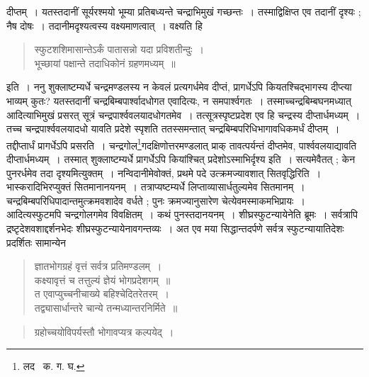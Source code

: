 \documentclass[11pt, openany]{book}
\begin{document}
\noindent दीप्तम्~। यतस्तदानीं सूर्यरश्मयो भूम्या प्रतिबध्यन्ते चन्द्राभिमुखं गच्छन्तः~। तस्माद्विक्षिप्त एव तदानीं दृश्यः ; 
नैष दोषः~। तदानीमदृश्यत्वस्य वक्ष्यमाणत्वात्~। वक्ष्यति हि\textendash  
\begin{quote}
{\qt स्फुटशशिमासान्तेऽर्कं पातासन्नो यदा प्रविशतीन्दुः~। \\
 भूच्छायां पक्षान्ते तदाधिकोनं ग्रहणमध्यम्~॥}
\end{quote}
इति~। ननु शुक्लाष्टम्यर्धे चन्द्रमण्डलस्य न केवलं प्रत्यगर्धमेव दीप्तं, प्रागर्धेऽपि कियतश्चिद्भागस्य दीप्त्या भाव्यम् कुतः? यतस्तदानीं चन्द्रबिम्बपार्श्वादधोगत एवादित्यः, न समपार्श्वगतः~। तस्माच्चन्द्रबिम्बघनमध्यात् आदित्याभिमुखं प्रसरत् सूत्रं चन्द्रपार्श्ववलयादधोगतमेव~।
तत्सूत्रस्पृष्टप्रदेश एव हि चन्द्रस्य दीप्तार्धमध्यम्~। तच्च चन्द्रपार्श्ववलयादधो यावति प्रदेशे स्पृशति ततस्समन्तात् चन्द्रबिम्बपरिधिभागावधिकमर्धं दीप्तम्~। तद्दीप्तार्धं प्रागर्धेऽपि प्रसरति~। चन्द्रगोल\renewcommand{\thefootnote}{१}\footnote{लद \textendash\ क. ग. घ.}गदक्षिणोत्तरमण्डलात् प्राक् तावत्पर्यन्तं दीप्तमेव, पार्श्ववलयाद्यावति दीप्तार्धमध्यम्~। तस्मात् शुक्लाष्टम्यर्धे प्रागर्धेऽपि कियांश्चित् प्रदेशोऽस्माभिर्दृश्य इति~। सत्यमेवैतत् ; केन पुनरर्धमेव तदा दृश्यमित्युक्तम्~। नन्विदानीमेवोक्तं, प्रथमे पदे उत्क्रमज्यावशात् सितवृद्धिरिति~। भास्करादिभिरप्युक्तं सितमानानयनम्~। तत्राप्यष्टम्यर्धे लिप्ताव्यासार्धतुल्यमेव सितमानम्~। चन्द्रबिम्बपरिधिपादान्तमुत्क्रमवशादेव वर्धते ; पुनः क्रमज्यानुसारेण चेत्येवमस्माकमभिप्रायः~। आदित्यस्फुटमपि चन्द्रगोलगमेव विवक्षितम्~। कथं पुनस्तदानयनम्~। शीघ्रस्फुटन्यायेनेति ब्रूमः~। सर्वत्रापि द्रष्टृदेशवशाद्दर्शनभेदः शीघ्रस्फुटन्यायेनावगन्तव्यः~। अत एव मया सिद्धान्तदर्पणे सर्वत्र स्फुटन्यायातिदेशः प्रदर्शितः सामान्येन\textendash  
\begin{quote}
{\qt ज्ञातभोगग्रहं वृत्तं सर्वत्र प्रतिमण्डलम्~। \\
कक्ष्यावृत्तं च तत्तुल्यं ज्ञेयं भोगप्रदेशगम्~॥ \\
त एवाप्युच्चनीचाख्ये बहिश्चेदितरेतरम्~। \\
तद्व्यासार्धान्तरे चान्ये तन्मध्यान्तरनिर्मिते~॥} 
\end{quote}

\newpage

\begin{quote}
{\qt ग्रहोच्चयोविपर्यस्तौ भोगावप्यत्र कल्पयेद्~।}
\end{quote}
\end{document}
